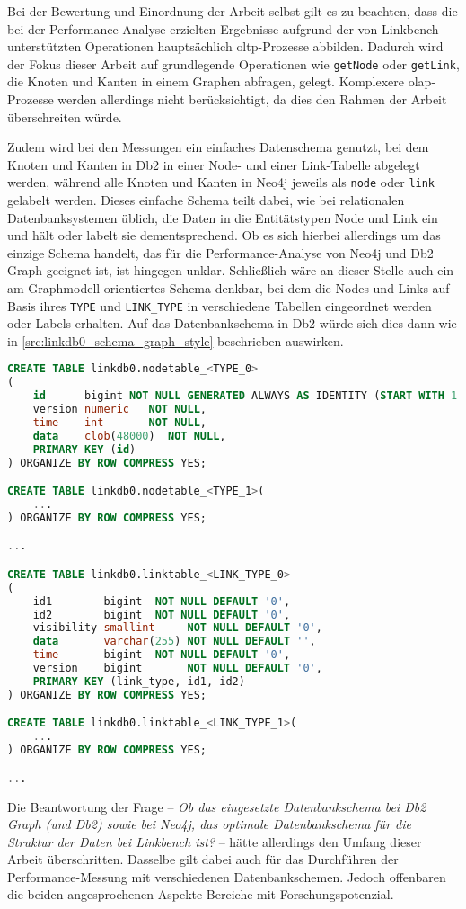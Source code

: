 Bei der Bewertung und Einordnung der Arbeit selbst gilt es zu beachten, dass die bei der Performance-Analyse erzielten Ergebnisse aufgrund der von Linkbench unterstützten Operationen hauptsächlich \acs{oltp}-Prozesse abbilden. Dadurch wird der Fokus dieser Arbeit auf grundlegende Operationen wie \texttt{getNode} oder \texttt{getLink}, die Knoten und Kanten in einem Graphen abfragen, gelegt. Komplexere \acs{olap}-Prozesse werden allerdings nicht berücksichtigt, da dies den Rahmen der Arbeit überschreiten würde. 

Zudem wird bei den Messungen ein einfaches Datenschema genutzt, bei dem Knoten und Kanten in Db2 in einer Node- und einer Link-Tabelle abgelegt werden, während alle Knoten und Kanten in Neo4j jeweils als \texttt{node} oder \texttt{link} gelabelt werden. Dieses einfache Schema teilt dabei, wie bei relationalen Datenbanksystemen üblich, die Daten in die Entitätstypen Node und Link ein und hält oder labelt sie dementsprechend. Ob es sich hierbei allerdings um das einzige Schema handelt, das für die Performance-Analyse von Neo4j und Db2 Graph geeignet ist, ist hingegen unklar. Schließlich wäre an dieser Stelle auch ein am Graphmodell orientiertes Schema denkbar, bei dem die Nodes und Links auf Basis ihres \texttt{TYPE} und \texttt{LINK\_TYPE} in verschiedene Tabellen eingeordnet werden oder Labels erhalten. Auf das Datenbankschema in Db2 würde sich dies dann wie in \autoref{src:linkdb0_schema_graph_style} beschrieben auswirken. 
\begin{lstlisting}[label=src:linkdb0_schema_graph_style,caption={Alternatives Datenbankschema für Db2},language=SQL]
CREATE TABLE linkdb0.nodetable_<TYPE_0>
(
    id      bigint NOT NULL GENERATED ALWAYS AS IDENTITY (START WITH 1 INCREMENT BY 1),
    version numeric   NOT NULL,
    time    int       NOT NULL,
    data    clob(48000)  NOT NULL,
    PRIMARY KEY (id)
) ORGANIZE BY ROW COMPRESS YES;

CREATE TABLE linkdb0.nodetable_<TYPE_1>(
    ...
) ORGANIZE BY ROW COMPRESS YES;

...

CREATE TABLE linkdb0.linktable_<LINK_TYPE_0>
(
    id1        bigint  NOT NULL DEFAULT '0',
    id2        bigint  NOT NULL DEFAULT '0',
    visibility smallint     NOT NULL DEFAULT '0',
    data       varchar(255) NOT NULL DEFAULT '',
    time       bigint  NOT NULL DEFAULT '0',
    version    bigint       NOT NULL DEFAULT '0',
    PRIMARY KEY (link_type, id1, id2)
) ORGANIZE BY ROW COMPRESS YES;

CREATE TABLE linkdb0.linktable_<LINK_TYPE_1>(
    ...
) ORGANIZE BY ROW COMPRESS YES;

...
\end{lstlisting}
Die Beantwortung der Frage -- \textit{Ob das eingesetzte Datenbankschema bei Db2 Graph (und Db2) sowie bei Neo4j, das optimale Datenbankschema für die Struktur der Daten bei Linkbench ist?} -- hätte allerdings den Umfang dieser Arbeit überschritten. Dasselbe gilt dabei auch für das Durchführen der Performance-Messung mit verschiedenen Datenbankschemen. Jedoch offenbaren die beiden angesprochenen Aspekte Bereiche mit Forschungspotenzial.

